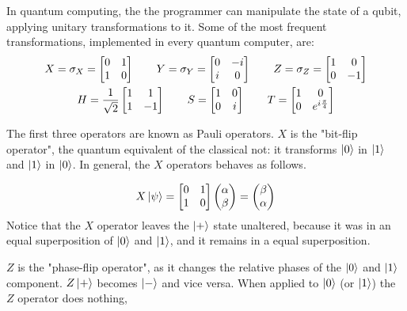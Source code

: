 In quantum computing, the the programmer can manipulate the state of a qubit, applying unitary transformations to it. Some of the most frequent transformations, implemented in every quantum computer, are:
\begin{gather*}
	X = \sigma_X = \begin{bmatrix}
	0 & 1 \\
	1 & 0
	\end{bmatrix} \qquad
	Y = \sigma_Y = \begin{bmatrix}
	0 & -i \\
	i & 0
	\end{bmatrix} \qquad
	Z = \sigma_Z = \begin{bmatrix}
	1 & 0 \\
	0 & -1
	\end{bmatrix} \\ 
	H = \frac{1}{\sqrt{2}}\begin{bmatrix}
	1 & 1 \\
	1 & -1
	\end{bmatrix} \qquad
 	S = \begin{bmatrix}
	1 & 0 \\
	0 & i
	\end{bmatrix}\qquad
	T = \begin{bmatrix}
	1 & 0 \\
	0 & e^{i\frac{\pi}{4}}
	\end{bmatrix} 
\end{gather*}

The first three operators are known as Pauli operators. $X$ is the "bit-flip operator", the quantum equivalent of the classical not: it transforms $\ket{0}$ in $\ket{1}$ and $\ket{1}$ in $\ket{0}$. In general, the $X$ operators behaves as follows.

\[ X\ket{\psi} = \begin{bmatrix}
	0 & 1 \\
	1 & 0
	\end{bmatrix} 
	\begin{pmatrix}
	\alpha \\
	\beta	
	\end{pmatrix} = 
	\begin{pmatrix}
	\beta \\
	\alpha	
	\end{pmatrix}
\] 
Notice that the $X$ operator leaves the $\ket{+}$ state unaltered, because it was in an equal superposition of $\ket{0}$ and $\ket{1}$, and it remains in a equal superposition.


$Z$ is the "phase-flip operator", as it changes the relative phases of the $\ket{0}$ and $\ket{1}$ component. $Z \ket{+}$ becomes $\ket{-}$ and vice versa. When applied to $\ket{0}$ (or $\ket{1}$) the $Z$ operator does nothing, 

